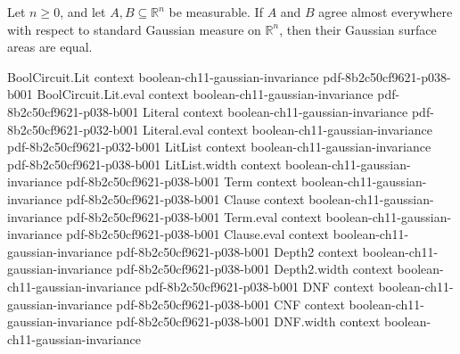 \begin{lemma}
\leanok
{}
Let $n\ge 0$, and let $A,B\subseteq\mathbb R^n$ be measurable. If $A$ and $B$ agree
almost everywhere with respect to standard Gaussian measure on $\mathbb R^n$, then their
Gaussian surface areas are equal.
\end{lemma}

\begin{theorem}
\leanok
{}
\proofstep
  {BoolCircuit.Lit}
  {context}
  {boolean-ch11-gaussian-invariance}
  {pdf-8b2c50cf9621-p038-b001}
\proofstep
  {BoolCircuit.Lit.eval}
  {context}
  {boolean-ch11-gaussian-invariance}
  {pdf-8b2c50cf9621-p038-b001}
\proofstep
  {Literal}
  {context}
  {boolean-ch11-gaussian-invariance}
  {pdf-8b2c50cf9621-p032-b001}
\proofstep
  {Literal.eval}
  {context}
  {boolean-ch11-gaussian-invariance}
  {pdf-8b2c50cf9621-p032-b001}
\proofstep
  {LitList}
  {context}
  {boolean-ch11-gaussian-invariance}
  {pdf-8b2c50cf9621-p038-b001}
\proofstep
  {LitList.width}
  {context}
  {boolean-ch11-gaussian-invariance}
  {pdf-8b2c50cf9621-p038-b001}
\proofstep
  {Term}
  {context}
  {boolean-ch11-gaussian-invariance}
  {pdf-8b2c50cf9621-p038-b001}
\proofstep
  {Clause}
  {context}
  {boolean-ch11-gaussian-invariance}
  {pdf-8b2c50cf9621-p038-b001}
\proofstep
  {Term.eval}
  {context}
  {boolean-ch11-gaussian-invariance}
  {pdf-8b2c50cf9621-p038-b001}
\proofstep
  {Clause.eval}
  {context}
  {boolean-ch11-gaussian-invariance}
  {pdf-8b2c50cf9621-p038-b001}
\proofstep
  {Depth2}
  {context}
  {boolean-ch11-gaussian-invariance}
  {pdf-8b2c50cf9621-p038-b001}
\proofstep
  {Depth2.width}
  {context}
  {boolean-ch11-gaussian-invariance}
  {pdf-8b2c50cf9621-p038-b001}
\proofstep
  {DNF}
  {context}
  {boolean-ch11-gaussian-invariance}
  {pdf-8b2c50cf9621-p038-b001}
\proofstep
  {CNF}
  {context}
  {boolean-ch11-gaussian-invariance}
  {pdf-8b2c50cf9621-p038-b001}
\proofstep
  {DNF.width}
  {context}
  {boolean-ch11-gaussian-invariance}

\end{theorem}

